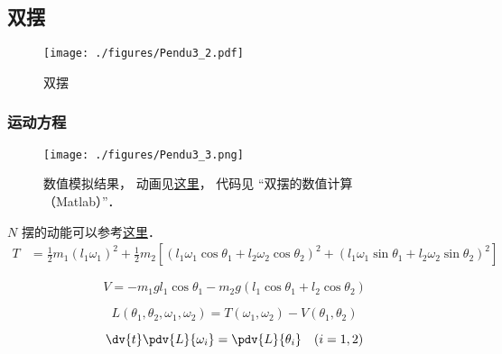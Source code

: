 
\begin{issues}
\issueDraft
\end{issues}


\subsection{双摆}
\begin{figure}[ht]
\centering
\texttt{[image: ./figures/Pendu3\_2.pdf]}
\caption{双摆} \label{Pendu3_fig2}
\end{figure}

\subsubsection{运动方程}
\begin{figure}[ht]
\centering
\texttt{[image: ./figures/Pendu3\_3.png]}
\caption{数值模拟结果， 动画见\href{https://wuli.wiki/apps/DbPend.html}{这里}， 代码见 “双摆的数值计算（Matlab）”．} \label{Pendu3_fig3}
\end{figure}

$N$ 摆的动能可以参考\href{https://travisdoesmath.github.io/pendulum-explainer/}{这里}．
\begin{equation}
\begin{aligned}
T &= \frac{1}{2} m_1 (l_1 \omega_1)^2 + \frac{1}{2} m_2 [(l_1 \omega_1 \cos\theta_1 + l_2 \omega_2 \cos\theta_2)^2 + (l_1 \omega_1 \sin\theta_1 + l_2 \omega_2 \sin\theta_2)^2]
\end{aligned}
\end{equation}

\begin{equation}  
V = -m_1 g l_1 \cos \theta_1 - m_2 g (l_1\cos \theta_1 + l_2 \cos \theta_2)
\end{equation}

\begin{equation}
L(\theta_1, \theta_2, \omega_1, \omega_2) = T(\omega_1, \omega_2) - V(\theta_1, \theta_2)
\end{equation}

\begin{equation}\label{Pendu3_eq1}
\dv{t}\pdv{L}{\omega_i} = \pdv{L}{\theta_i} \quad (i=1,2)
\end{equation}

